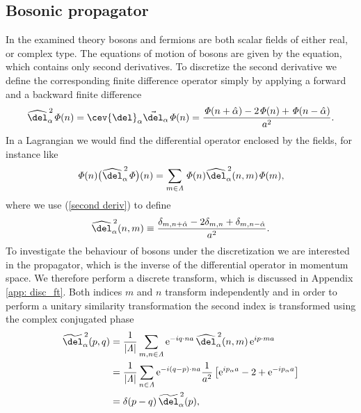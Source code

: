 \subsection{Bosonic propagator}
In the examined theory bosons and fermions are both scalar fields of either real, or complex  type. The equations of motion of bosons are given by the  equation, which contains only second derivatives. To discretize the second derivative we define the corresponding finite difference operator simply by applying a forward and a backward finite difference
\begin{align}
{\widehat{\del}_\alpha}^{\,2}\mathit{\Phi}(n) = \cev{\del}_{\alpha}\vec{\del}_{\alpha}\mathit{\Phi}(n) = \dfrac{\mathit{\Phi}(n+\hat{\alpha})-2\mathit{\Phi}(n)+\mathit{\Phi}(n-\hat{\alpha})}{a^{2}}.
\label{second deriv}
\end{align}
In a Lagrangian we would find the differential operator enclosed by the fields, for instance like
\begin{equation}
\mathit{\Phi}(n)\big({\widehat{\del}_\alpha}^{\,2}\mathit{\Phi}\big)(n) = \sum\limits_{m \in \mathit{\Lambda}} \mathit{\Phi}(n) {\widehat{\del}_\alpha}^{\,2}(n,m) \mathit{\Phi}(m),
\end{equation}
where we use (\ref{second deriv}) to define
\begin{equation}
{\widehat{\del}_\alpha}^{\,2}(n,m) \equiv	\dfrac{\delta_{m,n+\hat{\alpha}}-2\delta_{m,n}+\delta_{m,n-\hat{\alpha}}}{a^{2}}.
\end{equation}
To investigate the behaviour of bosons under the discretization we are interested in the propagator, which is the inverse of the differential operator in momentum space. We therefore perform a discrete  transform, which is discussed in Appendix \ref{app: disc_ft}. Both indices $m$ and $n$ transform independently and in order to perform a unitary similarity transformation the second index is  transformed using the complex conjugated phase \cite{gattringer2009quantum}
\begin{align}
{\widetilde{\del}_\alpha}^{\,2}(p,q) &= \dfrac{1}{\vert \mathit{\Lambda}\vert} \sum\limits_{m,n \in \mathit{\Lambda}} \mathrm{e}^{-iq\cdot na} \, {\widehat{\del}_\alpha}^{\,2}(n,m) \, \mathrm{e}^{i p\cdot ma} \notag \\
&= \dfrac{1}{\vert \mathit{\Lambda}\vert}\sum\limits_{n \in \mathit{\Lambda}} \mathrm{e}^{-i (q-p)\cdot na} \dfrac{1}{a^{2}} \left[ \mathrm{e}^{i p_{\alpha} a} -2 +\mathrm{e}^{-i p_{\alpha}a} \right] \\
&= \delta(p-q) \, {\widetilde{\del}_\alpha}^{\,2}(p), \notag
\end{align}
